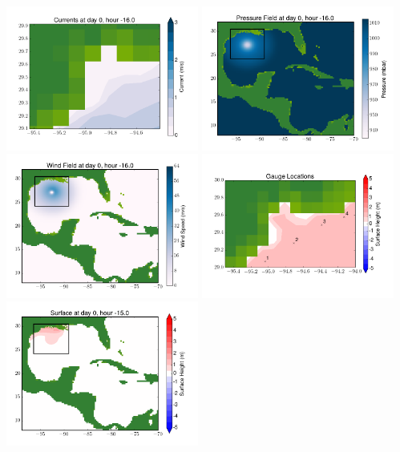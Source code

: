 \documentclass[11pt]{article}
\begin{document}
\vskip 10pt 
\includegraphics[width=0.475\textwidth]{frame0056fig7.png}
\includegraphics[width=0.475\textwidth]{frame0056fig8.png}
\vskip 10pt 
\includegraphics[width=0.475\textwidth]{frame0056fig9.png}
\includegraphics[width=0.475\textwidth]{frame0056fig10.png}
\vskip 10pt 
\includegraphics[width=0.475\textwidth]{frame0057fig1.png}
\end{document}
